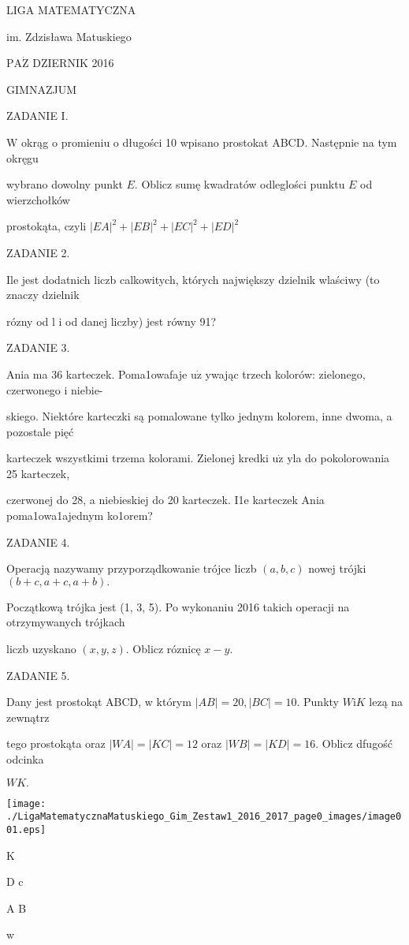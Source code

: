 \documentclass[a4paper,12pt]{article}
\begin{document}
LIGA MATEMATYCZNA

im. Zdzisława Matuskiego

$\mathrm{P}\mathrm{A}\dot{\mathrm{Z}}$ DZIERNIK 2016

GIMNAZJUM

ZADANIE I.

$\mathrm{W}$ okrąg o promieniu o długości 10 wpisano prostokat ABCD. Następnie na tym okręgu

wybrano dowolny punkt $E$. Oblicz sumę kwadratów odleglości punktu $E$ od wierzchołków

prostokąta, czyli $|EA|^{2}+|EB|^{2}+|EC|^{2}+|ED|^{2}$

ZADANIE 2.

Ile jest dodatnich liczb calkowitych, których największy dzielnik wlaściwy (to znaczy dzielnik

rózny od l i od danej liczby) jest równy 91?

ZADANIE 3.

Ania ma 36 karteczek. Poma1owafaje $\mathrm{u}\dot{\mathrm{z}}$ ywając trzech kolorów: zielonego, czerwonego i niebie-

skiego. Niektóre karteczki są pomalowane tylko jednym kolorem, inne dwoma, a pozostale pięć

karteczek wszystkimi trzema kolorami. Zielonej kredki $\mathrm{u}\dot{\mathrm{z}}$ yla do pokolorowania 25 karteczek,

czerwonej do 28, a niebieskiej do 20 karteczek. I1e karteczek Ania poma1owa1ajednym ko1orem?

ZADANIE 4.

Operacją nazywamy przyporządkowanie trójce liczb $(a,b,c)$ nowej trójki $(b+c,a+c,a+b).$

Początkową trójka jest (1, 3, 5). Po wykonaniu 2016 takich operacji na otrzymywanych trójkach

liczb uzyskano $(x,y,z)$. Oblicz róznicę $x-y.$

ZADANIE 5.

Dany jest prostokąt ABCD, w którym $|AB|=20, |BC|=10$. Punkty $W\mathrm{i}K$ lezą na zewnątrz

tego prostokąta oraz $|WA| = |KC| = 12$ oraz $|WB| = |KD| = 16$. Oblicz dfugość odcinka

$WK.$
\begin{center}
\texttt{[image: ./LigaMatematycznaMatuskiego\_Gim\_Zestaw1\_2016\_2017\_page0\_images/image001.eps]}
\end{center}
K

D c

A B

w
\end{document}
